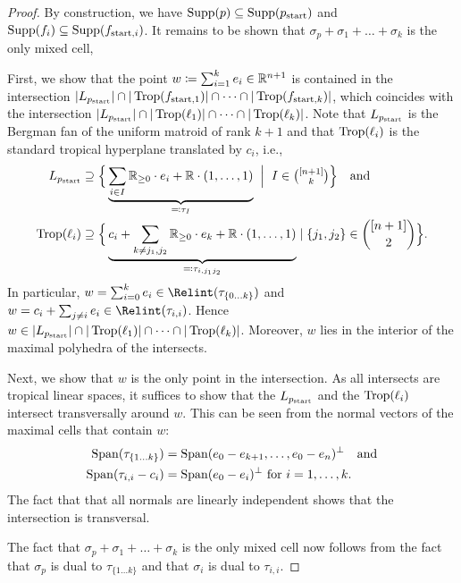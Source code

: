 \begin{proof}
  By construction, we have $\operatorname{Supp}(p)\subseteq \operatorname{Supp}(p_{\mathrm{start}})$ and $\operatorname{Supp}(f_i)\subseteq\operatorname{Supp}(f_{{\mathrm{start}},i})$. It remains to be shown that $\sigma_p+\sigma_1+\dots+\sigma_k$ is the only mixed cell,

  First, we show that the point $w\coloneqq \sum_{i=1}^ke_i\in\mathbb{R}^{n+1}$ is contained in the intersection $|L_{p_{\mathrm{start}}}|\cap|\operatorname{Trop}(f_{{\mathrm{start}},1})|\cap\cdots\cap|\operatorname{Trop}(f_{{\mathrm{start}},k})|$, which coincides with the intersection $|L_{p_{\mathrm{start}}}|\cap|\operatorname{Trop}(\ell_{1})|\cap\cdots\cap|\operatorname{Trop}(\ell_{k})|$.  Note that $L_{p_{\mathrm{start}}}$ is the Bergman fan of the uniform matroid of rank $k+1$ and that $\operatorname{Trop}(\ell_i)$ is the standard tropical hyperplane translated by $c_i$, i.e.,
  \begin{align*}
    L_{p_\start} &\supseteq \Big\{ \underbrace{\sum_{i\in I}\RR_{\geq 0} \cdot e_i + \RR \cdot (1, \dots, 1) }_{\eqqcolon\tau_I}\bigmid I\in\textstyle\binom{[n+1]}{k} \Big\}\quad \text{and}\\
    \Trop(\ell_{i})&\supseteq \Big\{ \underbrace{c_i+\sum_{k\neq j_1,j_2} \RR_{\geq 0} \cdot e_k + \RR \cdot (1, \dots, 1)}_{\eqqcolon\tau_{i,j_1j_2}} \mid \{j_1,j_2\}\in \binom{[n+1]}{2} \Big\}.
  \end{align*}
  In particular, $w=\sum_{i=0}^ke_i\in\Relint(\tau_{\{0\dots k\}})$ and $w=c_i+\sum_{j\neq i}e_i\in\Relint(\tau_{i,i})$.  Hence $w \in |L_{p_{\mathrm{start}}}|\cap|\operatorname{Trop}(\ell_{1})|\cap\cdots\cap|\operatorname{Trop}(\ell_{k})|$.  Moreover, $w$ lies in the interior of the maximal polyhedra of the intersects.

  Next, we show that $w$ is the only point in the intersection.  As all intersects are tropical linear spaces, it suffices to show that the $L_{p_{\mathrm{start}}}$ and the $\operatorname{Trop}(\ell_i)$ intersect transversally around $w$.  This can be seen from the normal vectors of the maximal cells that contain $w$:
  \begin{align*}
    \operatorname{Span}(\tau_{\{1\dots k\}}) &= \operatorname{Span}(e_0-e_{k+1},\dots,e_0-e_{n})^\perp \quad\text{and}\\
    \operatorname{Span}(\tau_{i,i}-c_i) &= \operatorname{Span}(e_0-e_i)^\perp \text{ for }i=1,\dots,k.
  \end{align*}
  The fact that that all normals are linearly independent shows that the intersection is transversal.

  The fact that $\sigma_p+\sigma_1+\dots+\sigma_k$ is the only mixed cell now follows from the fact that $\sigma_p$ is dual to $\tau_{\{1\dots k\}}$ and that $\sigma_i$ is dual to $\tau_{i,i}$.
\end{proof}

